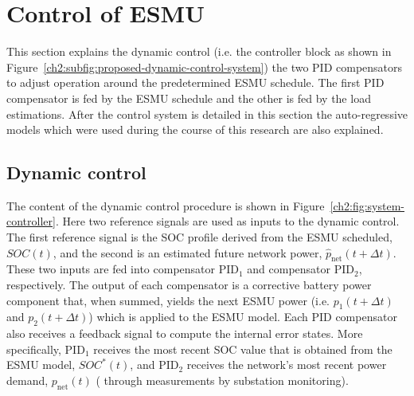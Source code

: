 \section{Control of ESMU}
\label{ch2:sec:control-of-esmu}



This section explains the dynamic control (i.e. the controller block as shown in Figure~\ref{ch2:subfig:proposed-dynamic-control-system})  the two PID compensators to adjust operation around the predetermined ESMU schedule.
The first PID compensator is fed by the ESMU schedule and the other is fed by the  load estimations.
After the control system is detailed in this section the auto-regressive models which were used during the course of this research are also explained.

\subsection{Dynamic control}

The content of the dynamic control procedure is shown in Figure~\ref{ch2:fig:system-controller}.
Here two reference signals are used as inputs to the dynamic control.
The first reference signal is the SOC profile derived from the ESMU scheduled, $SOC(t)$, and the second is an estimated future network power, $\hat{p}_\text{net}(t+\Delta t)$.
These two inputs are fed into compensator PID$_1$ and compensator PID$_2$, respectively.
The output of each compensator is a corrective battery power component that, when summed, yields the next ESMU power (i.e. $p_1(t+\Delta t)$ and $p_2(t+\Delta t)$) which is applied to the ESMU model.
Each PID compensator also receives a feedback signal to compute the internal error states.
More specifically, PID$_1$ receives the most recent SOC value that is obtained from the ESMU model, $SOC^*(t)$, and PID$_2$ receives the network's most recent power demand, $p_\text{net}(t)$ ( through measurements by substation monitoring).

